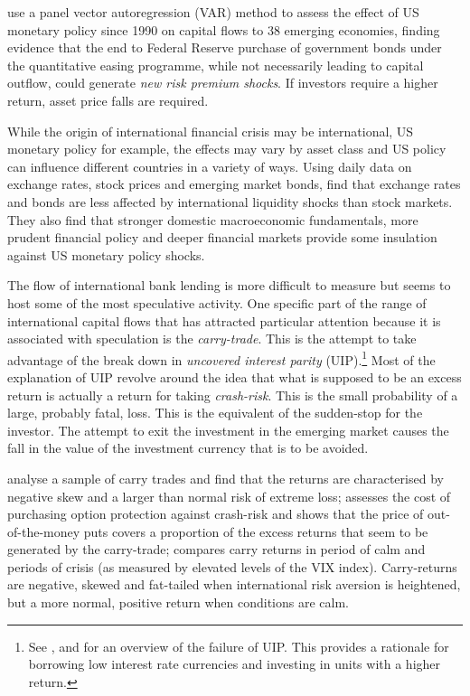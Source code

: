 \documentclass[12pt, a4paper, oneside]{article}\usepackage[]{graphicx}\usepackage[]{color}
\begin{document}
\citet{IMFLatam} use a panel vector autoregression (VAR) method to assess the effect of US monetary policy since 1990 on capital flows to 38 emerging economies, finding evidence that the end to Federal Reserve purchase of government bonds under the quantitative easing programme, while not necessarily leading to capital outflow, could generate \emph{new risk premium shocks}.   If investors require a higher return, asset price falls are required. 

While the origin of international financial crisis may be international, US monetary policy for example, the effects may vary by asset class and US policy can influence different countries in a variety of ways.  Using daily data on exchange rates, stock prices and emerging market bonds, \citet{Tapering} find that exchange rates and bonds are less affected by international liquidity shocks than stock markets.  They also find that stronger domestic macroeconomic fundamentals, more prudent financial policy and deeper financial markets provide some insulation against US monetary policy shocks.

The flow of international bank lending is more difficult to measure but seems to host some of the most speculative activity.  One specific part of the range of international capital flows that has attracted particular attention because it is associated with speculation is the \emph{carry-trade}.  This is the attempt to take advantage of the break down in \emph{uncovered interest parity} (UIP).\footnote{See \citet{fama1993common}, \citet{FrootFrankelFDB} and \citet{Hayward2013} for an overview of the failure of UIP.  This provides a rationale for borrowing low interest rate currencies and investing in units with a higher return.} Most of the explanation of UIP revolve around the idea that what is supposed to be an excess return is actually a return for taking \emph{crash-risk}.  This is the small probability of a large, probably fatal, loss. This is the equivalent of the sudden-stop for the investor. The attempt to exit the investment in the emerging market causes the fall in the value of the investment currency that is to be avoided. 

\citet{BrunnermeierCarry} analyse a sample of carry trades and find that the returns are characterised by negative skew and a larger than normal risk of extreme loss; \citet{JurekCrash} assesses the cost of purchasing option protection against crash-risk and shows that the price of out-of-the-money puts covers a proportion of the excess returns that seem to be generated by the carry-trade; \citet{Hayward2013} compares carry returns in period of calm and periods of crisis (as measured by elevated levels of the VIX index).  Carry-returns are negative, skewed and fat-tailed when international risk aversion is heightened, but a more normal, positive return when conditions are calm. 
\end{document}

